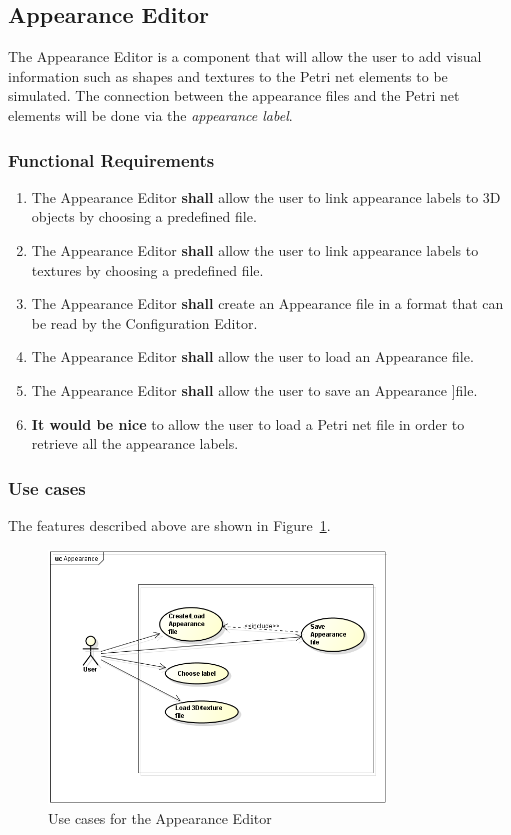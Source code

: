 \subsection{Appearance Editor}
\label{sec:sf-appearance}

The Appearance Editor is a component that will allow the user to add visual information such as shapes and textures to the Petri net elements to be simulated. The connection between the appearance files and the Petri net elements will be done via the \textit{appearance label}. 

\subsubsection{Functional Requirements}

\begin{enumerate}
\item The Appearance Editor \textbf{shall} allow the user to link appearance labels to 3D objects by choosing a predefined file.
\item The Appearance Editor \textbf{shall} allow the user to link appearance labels to textures by choosing a predefined file.
\item The Appearance Editor \textbf{shall} create an Appearance file in a format that can be read by the Configuration Editor.
\item The Appearance Editor \textbf{shall} allow the user to load an Appearance file.
\item The Appearance Editor \textbf{shall} allow the user to save an Appearance ]file.
\item \textbf{It would be nice} to allow the user to load a Petri net file in order to retrieve all the appearance labels.     
\end{enumerate}

\subsubsection{Use cases}

The features described above are shown in Figure~\ref{fig:use-cases-appearance-editor}.

\begin{figure}[htp]
\begin{center}
  \includegraphics[width=0.8\textwidth]{image/uc-appearance.png}
  \caption{Use cases for the Appearance Editor}
  \label{fig:use-cases-appearance-editor}
\end{center}
\end{figure}


